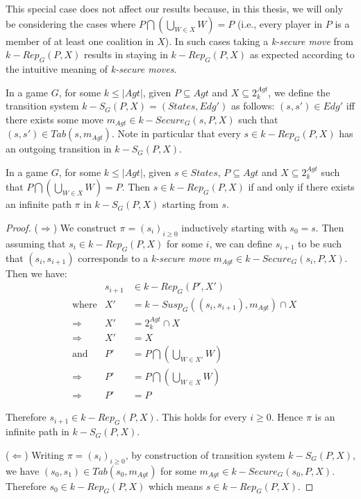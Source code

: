 This special case does not affect our results because, in this thesis, we will only be considering the cases where $P \bigcap \left( \bigcup \limits_{W \in X}W \right) = P$ (i.e., every player in $P$ is a member of at least one coalition in $X$). In such cases taking a \textit{k-secure move} from $k-Rep_{G}(P, X)$ results in staying in $k-Rep_{G}(P, X)$ as expected according to the intuitive meaning of \textit{k-secure moves}.

\begin{definition}
\label{k-spx}
In a game $G$, for some $k \leq \vert Agt \vert$, given $P \subseteq Agt$ and $X \subseteq 2^{Agt}_{k}$, we define the transition system $k-S_{G}(P, X) = (States, Edg')$ as follows: $(s, s') \in Edg'$ iff there exists some move $m_{Agt} \in k-Secure_{G}(s, P, X)$ such that $(s, s') \in Tab(s, m_{Agt})$. Note in particular that every $s \in k-Rep_{G}(P, X)$ has an outgoing transition in $k-S_{G}(P, X)$.
\end{definition}

\begin{lemma}
\label{lemma3}
In a game $G$, for some $k \leq \vert Agt \vert$, given $s \in States$, $P \subseteq Agt$ and $X \subseteq 2^{Agt}_{k}$ such that $P \bigcap \left( \bigcup \limits_{W \in X}W \right) = P$. Then $s \in k-Rep_{G}(P, X)$ if and only if there exists an infinite path $\pi$ in $k-S_{G}(P, X)$ starting from $s$.
\end{lemma}

\begin{proof}
($\Rightarrow$) We construct $\pi = (s_{i})_{i\geq 0}$ inductively starting with $s_{0} = s$. Then assuming that $s_{i} \in k-Rep_{G}(P, X)$ for some $i$, we can define $s_{i+1}$ to be such that $(s_{i}, s_{i+1})$ corresponds to a \textit{k-secure move} $m_{Agt} \in k-Secure_{G}(s_{i}, P, X)$. Then we have:
\begin{align*}
&\qquad & s_{i+1} &\in k-Rep_{G}(P', X')\\
&\text{where} & X' &= k-Susp_{G}((s_{i}, s_{i+1}), m_{Agt}) \cap X\\
&\Rightarrow & X' &= 2^{Agt}_{k} \cap X\\
&\Rightarrow & X' &= X\\
&\text{and} & P' &= P \bigcap \left( \bigcup \limits_{W \in X'}W \right)\\
&\Rightarrow & P' &= P \bigcap \left( \bigcup \limits_{W \in X}W \right)\\
&\Rightarrow & P' &= P
\end{align*}

Therefore $s_{i+1} \in k-Rep_{G}(P, X)$. This holds for every $i \geq 0$. Hence $\pi$ is an infinite path in $k-S_{G}(P, X)$.

($\Leftarrow$) Writing $\pi = (s_{i})_{i\geq 0}$, by construction of transition system $k-S_{G}(P, X)$, we have $(s_{0}, s_{1}) \in Tab(s_{0}, m_{Agt})$ for some $m_{Agt} \in k-Secure_{G}(s_{0}, P, X)$. Therefore $s_{0} \in k-Rep_{G}(P, X)$ which means $s \in k-Rep_{G}(P, X)$.
\end{proof}

